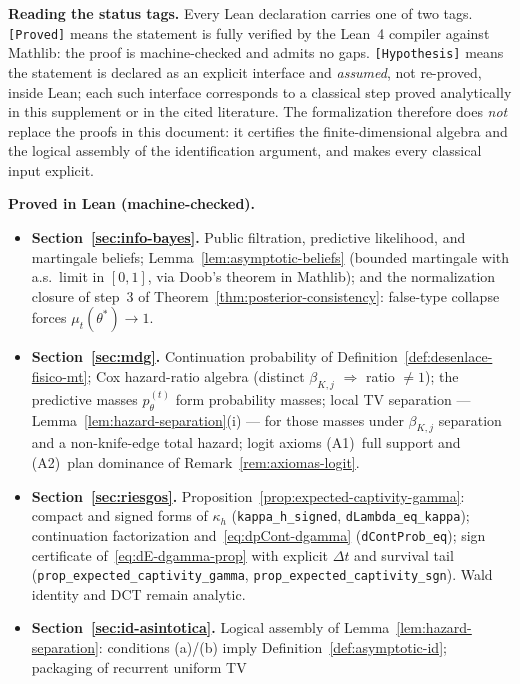 \documentclass[12pt]{article}
\numberwithin{equation}{section}
\numberwithin{table}{section}
\theoremstyle{definition}
\begin{document}
\medskip
\noindent\textbf{Reading the status tags.}
Every Lean declaration carries one of two tags. \texttt{[Proved]} means the
statement is fully verified by the Lean~4 compiler against Mathlib: the proof
is machine-checked and admits no gaps. \texttt{[Hypothesis]} means the
statement is declared as an explicit interface and \emph{assumed}, not
re-proved, inside Lean; each such interface corresponds to a classical step
proved analytically in this supplement or in the cited literature. The
formalization therefore does \emph{not} replace the proofs in this document:
it certifies the finite-dimensional algebra and the logical assembly of the
identification argument, and makes every classical input explicit.

\medskip
\noindent\textbf{Proved in Lean (machine-checked).}
\begin{itemize}
  \item \textbf{Section~\ref{sec:info-bayes}.}
  Public filtration, predictive likelihood, and martingale beliefs;
  Lemma~\ref{lem:asymptotic-beliefs} (bounded martingale with a.s.\ limit in
  $[0,1]$, via Doob's theorem in Mathlib); and the normalization closure of
  step~3 of Theorem~\ref{thm:posterior-consistency}: false-type collapse
  forces $\mu_t(\theta^\ast)\to 1$.
  \item \textbf{Section~\ref{sec:mdg}.}
  Continuation probability of Definition~\ref{def:desenlace-fisico-mt}; Cox
  hazard-ratio algebra (distinct $\beta_{K,j}$ $\Rightarrow$ ratio
  $\neq 1$); the predictive masses $p_\theta^{(t)}$ form probability masses;
  local TV separation --- Lemma~\ref{lem:hazard-separation}(i) --- for those
  masses under $\beta_{K,j}$ separation and a non-knife-edge total hazard;
  logit axioms (A1)~full support and (A2)~plan dominance of
  Remark~\ref{rem:axiomas-logit}.
  \item \textbf{Section~\ref{sec:riesgos}.}
  Proposition~\ref{prop:expected-captivity-gamma}: compact and signed forms of
  $\kappa_h$ (\texttt{kappa\_h\_signed}, \texttt{dLambda\_eq\_kappa});
  continuation factorization and~\eqref{eq:dpCont-dgamma}
  (\texttt{dContProb\_eq}); sign certificate
  of~\eqref{eq:dE-dgamma-prop} with explicit $\Delta t$ and survival tail
  (\texttt{prop\_expected\_captivity\_gamma},
  \texttt{prop\_expected\_captivity\_sgn}). Wald identity and DCT remain
  analytic.
  \item \textbf{Section~\ref{sec:id-asintotica}.}
  Logical assembly of Lemma~\ref{lem:hazard-separation}: conditions (a)/(b)
  imply Definition~\ref{def:asymptotic-id}; packaging of recurrent uniform TV

\end{itemize}
\end{document}
